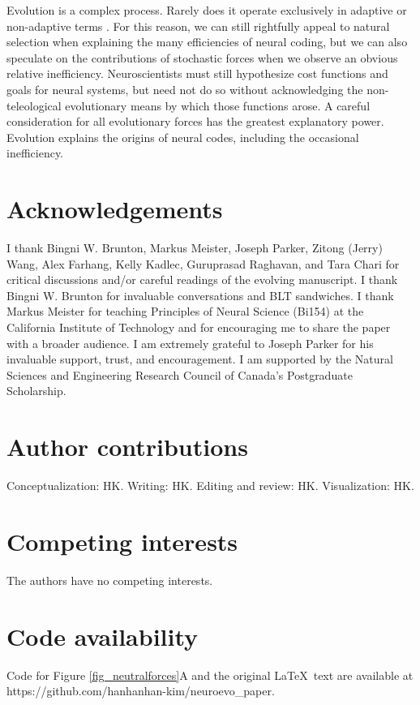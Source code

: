 \documentclass[twocolumn]{article}
\begin{document}
Evolution is a complex process. Rarely does it operate exclusively in adaptive or non-adaptive terms \cite{Gould_Lewontin_1979}. For this reason, we can still rightfully appeal to natural selection when explaining the many efficiencies of neural coding, but we can also speculate on the contributions of stochastic forces when we observe an obvious relative inefficiency. Neuroscientists must still hypothesize cost functions and goals for neural systems, but need not do so without acknowledging the non-teleological evolutionary means by which those functions arose. A careful consideration for all evolutionary forces has the greatest explanatory power. Evolution explains the origins of neural codes, including the occasional inefficiency. 

\newpage
\section*{Acknowledgements}
I thank  Bingni W. Brunton, Markus Meister, Joseph Parker, Zitong (Jerry) Wang, Alex Farhang, Kelly Kadlec, Guruprasad Raghavan, and Tara Chari for critical discussions and/or careful readings of the evolving manuscript. I thank Bingni W. Brunton for invaluable conversations and BLT sandwiches. I thank Markus Meister for teaching Principles of Neural Science (Bi154) at the California Institute of Technology and for encouraging me to share the paper with a broader audience. I am extremely grateful to Joseph Parker for his invaluable support, trust, and encouragement. I am supported by the Natural Sciences and Engineering Research Council of Canada's Postgraduate Scholarship. 

\section*{Author contributions}
Conceptualization: HK. Writing: HK. Editing and review: HK. Visualization: HK. 

\section*{Competing interests}
The authors have no competing interests.

\section*{Code availability}
Code for Figure \ref{fig_neutralforces}A and the original \LaTeX \ text are available at https://github.com/hanhanhan-kim/neuroevo\_paper. 

\newpage
 




\end{document}
